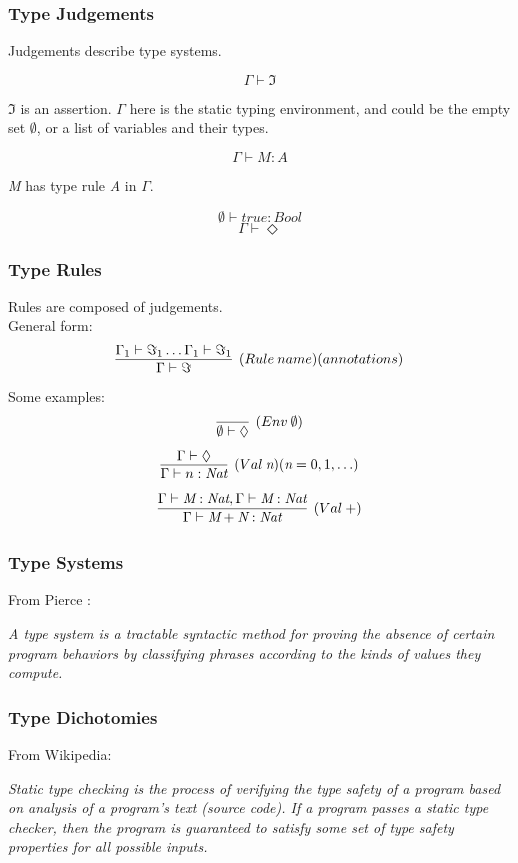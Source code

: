 \documentclass{beamer}
\newcommand{\G}{\Gamma}
\begin{document}
\begin{frame}
  \frametitle{Type Judgements}

  \vspace{20pt}
  Judgements describe type systems.

  \[ \G \vdash \Im \]

  $\Im$ is an assertion. $\Gamma$ here is the static typing environment, and
  could be the empty set $\emptyset$, or a list of variables and their types.

  \[ \G \vdash \textit{M} : \textit{A} \]

  \textit{M} has type rule \textit{A} in $\Gamma$.

  \[ \emptyset \vdash \textit{true} : \textit{Bool} \]
  \[ \G \vdash \Diamond \]
\end{frame}

\begin{frame}
  \frametitle{Type Rules}
  \vspace{20pt}
  Rules are composed of judgements.\\
  \vspace{10pt}
  General form:
  \[ \infer[(Rule\:name)(annotations)]{\Gamma \vdash \Im}{\Gamma_1 \vdash \Im_1
      \ldots \Gamma_1 \vdash \Im_1} \]
  Some examples:
  \vspace{2pt}
  \[ \infer[(Env\:\emptyset)]{\emptyset \vdash \Diamond}{} \]
  \vspace{2pt}
  \[ \infer[(Val\:\textit{n})(\textit{n} = 0,1,\ldots)]{\G \vdash n :
      \textit{Nat}}{\G \vdash \Diamond} \]
  \vspace{2pt}
  \[ \infer[(Val\:+)]{\G \vdash \textit{M} + \textit{N} : \textit{Nat}}{\G
      \vdash \textit{M} : \textit{Nat}, \G \vdash \textit{M} : \textit{Nat}} \]
\end{frame}

\begin{frame}
  \frametitle{Type Systems}
  From Pierce \cite{TAPL}:
  \vspace{20pt}

  \textit{A type system is a tractable syntactic method for proving the absence
    of certain program behaviors by classifying phrases according to the kinds
    of values they compute.}

\end{frame}

\begin{frame}
  \frametitle{Type Dichotomies}
  From Wikipedia:
  \vspace{20pt}

  \textit{Static type checking is the process of verifying the
    type safety of a program based on analysis of a program's text (source
    code). If a program passes a static type checker, then the program is
    guaranteed to satisfy some set of type safety properties for all possible
    inputs.}
\end{frame}
\end{document}
